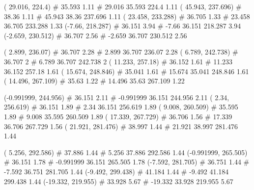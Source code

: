 \documentclass[a4paper,openbib,10pt]{article}
\newenvironment{treegraph}{\begin{graph}}{\end{graph}}
\begin{document}
\begin{treegraph}
  ( 29.016, 224.4) #     35.593    1.11
   #    29.016    35.593    224.4    1.11
  ( 45.943, 237.696) #     38.36    1.11
   #    45.943    38.36    237.696    1.11
  ( 23.458, 233.288) #     36.705    1.33
   #    23.458    36.705    233.288    1.33
  (-7.66, 218.287) #     36.151    3.94
   #    -7.66    36.151    218.287    3.94
  (-2.659, 230.512) #     36.707    2.56
   #    -2.659    36.707    230.512    2.56

  ( 2.899, 236.07) #     36.707    2.28
   #    2.899    36.707    236.07    2.28
  ( 6.789, 242.738) #     36.707    2
   #    6.789    36.707    242.738    2
  ( 11.233, 257.18) #     36.152    1.61
   #    11.233    36.152    257.18    1.61
  ( 15.674, 248.846) #     35.041    1.61
   #    15.674    35.041    248.846    1.61
  ( 14.496, 267.109) #     35.63    1.22
   #    14.496    35.63    267.109    1.22

  (-0.991999, 244.956) #     36.151    2.11
   #    -0.991999    36.151    244.956    2.11
  ( 2.34, 256.619) #     36.151    1.89
   #    2.34    36.151    256.619    1.89
  ( 9.008, 260.509) #     35.595    1.89
   #    9.008    35.595    260.509    1.89
  ( 17.339, 267.729) #     36.706    1.56
   #    17.339    36.706    267.729    1.56
  ( 21.921, 281.476) #     38.997    1.44
   #    21.921    38.997    281.476    1.44

  ( 5.256, 292.586) #     37.886    1.44
   #    5.256    37.886    292.586    1.44
  (-0.991999, 265.505) #     36.151    1.78
   #    -0.991999    36.151    265.505    1.78
  (-7.592, 281.705) #     36.751    1.44
   #    -7.592    36.751    281.705    1.44
  (-9.492, 299.438) #     41.184    1.44
   #    -9.492    41.184    299.438    1.44
  (-19.332, 219.955) #     33.928    5.67
   #    -19.332    33.928    219.955    5.67


\end{treegraph}
\end{document}
